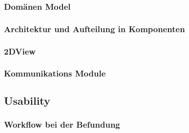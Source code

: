\subsubsection{Domänen Model}
\label{sec:Domänen Model}

\subsubsection{Architektur und Aufteilung in Komponenten}
\label{sec:Architektur und Aufteilung in Komponenten}

\subsubsection{2DView}
\label{sec:2DView}

\subsubsection{Kommunikations Module}
\label{sec:Kommunikations Module}

\subsection{Usability}
\label{sec:Usability}

\subsubsection{Workflow bei der Befundung}
\label{sec:Workflow bei der Befundung}

